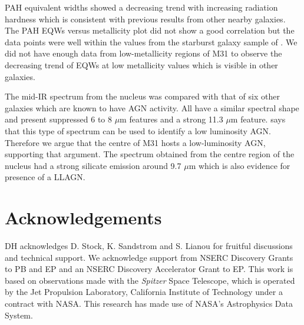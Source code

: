 \documentclass[useAMS,usenatbib,a4paper]{mn2e}
\begin{document}
PAH equivalent widths showed a decreasing trend with increasing radiation hardness which is consistent with previous results from other nearby galaxies. The PAH EQWs versus metallicity plot did not show a good correlation but the data points were well within the values from the starburst galaxy sample of \citet{Engelbracht_2008}. We did not have enough data from low-metallicity regions of M31 to observe the decreasing trend of EQWs at low metallicity values which is visible in other galaxies.

The mid-IR spectrum from the nucleus was compared with that of six other galaxies which are known to have AGN activity. All have a similar spectral shape and present suppressed 6 to 8 $\mu$m features and a strong 11.3 $\mu$m feature. \citealt{Smith:2007lr} says that this type of spectrum can be used to identify a low luminosity AGN. Therefore we argue that the centre of M31 hosts a low-luminosity AGN, supporting that argument. The spectrum obtained from the centre region of the nucleus had a strong silicate emission around 9.7 $\mu$m which is also evidence for presence of a LLAGN. 

\section*{Acknowledgements}


DH acknowledges D. Stock, K. Sandstrom and S. Lianou for fruitful discussions and technical support. We acknowledge support from NSERC Discovery Grants to PB and EP and an NSERC Discovery Accelerator Grant to EP. 
This work is based on observations made with the {\em Spitzer} Space Telescope, which is operated by the Jet Propulsion Laboratory, California Institute of Technology under a contract with NASA.
This research has made use of NASA's Astrophysics Data System.




{}

\bsp

\label{lastpage}
\end{document}
